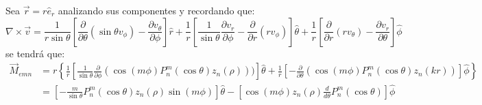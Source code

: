 Sea $\Vec{r}=r\hat{e}_r$ analizando sus componentes y recordando que:
$$\nabla\times\Vec{v}=\frac{1}{r\sin\theta}\left[\frac{\partial}{\partial\theta} (\sin\theta v_{\phi})-\frac{\partial v_\theta}{\partial\phi}\right]\hat{r}+\frac{1}{r}\left[\frac{1}{\sin\theta}\frac{\partial v_r}{\partial\phi}-\frac{\partial}{\partial r}(rv_\phi)\right]\hat{\theta}+\frac{1}{r}\left[\frac{\partial}{\partial r}(r v_\theta)-\frac{\partial v_r}{\partial\theta}\right]\hat{\phi}$$
se tendrá que:
\begin{align*}
    \Vec{M}_{emn}&=r\left\lbrace\frac{1}{r}\left[\frac{1}{\sin\theta}\frac{\partial }{\partial\phi}(\cos (m\phi)P_n^m(\cos\theta)z_n(\rho)))\right]\hat{\theta}+\frac{1}{r}\left[-\frac{\partial }{\partial\theta}(\cos (m\phi)P_n^m(\cos\theta)z_n(kr))\right]\hat{\phi}\right\rbrace\\
    &=\left[-\frac{m}{\sin\theta}P_n^m(\cos\theta)z_n(\rho)\sin (m\phi)\right]\hat{\theta}-\left[\cos(m\phi)z_n(\rho)\frac{d}{d\theta}P_n^m(\cos\theta)\right]\hat{\phi}\\\
\end{align*}

